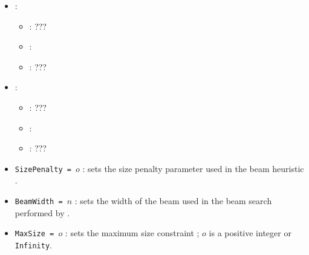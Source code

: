 \begin{itemize}
\begin{itemize}
           \end{itemize}
    \item {}:
           \begin{itemize}
                \item \optionPossibleValues{}: ???
                \item \optionDefaultValue{}: 
                \item \optionDescrption{}: ???
           \end{itemize}
    \item {}:
           \begin{itemize}
                \item \optionPossibleValues{}: ???
                \item \optionDefaultValue{}: 
                \item \optionDescrption{}: ???
           \end{itemize}
\end{itemize}


\begin{itemize}
	\item {\tt SizePenalty = $o$} : sets the size penalty parameter used in the beam heuristic \cite{Kocev07a:proc}.
	\item {\tt BeamWidth = $n$} : sets the width of the beam used in the beam search performed by \clus{} \cite{Kocev07a:proc}.
	\item {\tt MaxSize = $o$} : sets the maximum size constraint \cite{Kocev07a:proc}; $o$ is a positive integer or {\tt Infinity}.
\end{itemize}

